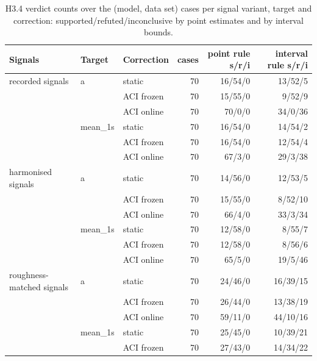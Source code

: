 \begin{table}[htbp]
\centering
\small
\caption{H3.4 verdict counts over the (model, data set) cases per signal variant, target and correction: supported/refuted/inconclusive by point estimates and by interval bounds.}
\label{tab:t4-h34-verdict-counts}
\begin{tabular}{lllrrr}
\toprule
Signals & Target & Correction & cases & point rule s/r/i & interval rule s/r/i \\
\midrule
recorded signals & a & static & 70 & 16/54/0 & 13/52/5 \\
 &  & ACI frozen & 70 & 15/55/0 & 9/52/9 \\
 &  & ACI online & 70 & 70/0/0 & 34/0/36 \\
\midrule
 & mean\_1s & static & 70 & 16/54/0 & 14/54/2 \\
 &  & ACI frozen & 70 & 16/54/0 & 12/54/4 \\
 &  & ACI online & 70 & 67/3/0 & 29/3/38 \\
\midrule
harmonised signals & a & static & 70 & 14/56/0 & 12/53/5 \\
 &  & ACI frozen & 70 & 15/55/0 & 8/52/10 \\
 &  & ACI online & 70 & 66/4/0 & 33/3/34 \\
\midrule
 & mean\_1s & static & 70 & 12/58/0 & 8/55/7 \\
 &  & ACI frozen & 70 & 12/58/0 & 8/56/6 \\
 &  & ACI online & 70 & 65/5/0 & 19/5/46 \\
\midrule
roughness-matched signals & a & static & 70 & 24/46/0 & 16/39/15 \\
 &  & ACI frozen & 70 & 26/44/0 & 13/38/19 \\
 &  & ACI online & 70 & 59/11/0 & 44/10/16 \\
\midrule
 & mean\_1s & static & 70 & 25/45/0 & 10/39/21 \\
 &  & ACI frozen & 70 & 27/43/0 & 14/34/22 \\

\end{tabular}
\end{table}
